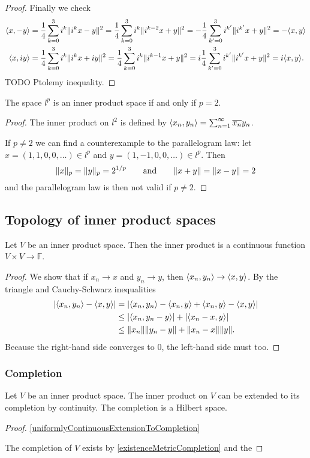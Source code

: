 \begin{proof}
Finally we check
\begin{align*}
\inner{x,-y} &= \frac{1}{4}\sum_{k=0}^3i^k\norm{i^k x - y}^2 = \frac{1}{4}\sum_{k=0}^3i^k\norm{i^{k-2} x + y}^2 = -\frac{1}{4}\sum_{k'=0}^3i^{k'}\norm{i^{k'} x + y}^2 = -\inner{x,y} \\
\inner{x,iy} &= \frac{1}{4}\sum_{k=0}^3i^k\norm{i^k x + iy}^2 = \frac{1}{4}\sum_{k=0}^3i^k\norm{i^{k-1} x + y}^2 = i\frac{1}{4}\sum_{k'=0}^3i^{k'}\norm{i^{k'} x + y}^2 = i\inner{x,y}.
\end{align*}
TODO Ptolemy inequality.
\end{proof}
\begin{corollary}
The space $l^p$ is an inner product space \textup{if and only if} $p=2$.
\end{corollary}
\begin{proof}
The inner product on $l^2$ is defined by $\inner{x_n, y_n} = \sum_{n=1}^\infty \overline{x_n}y_n$.

If $p\neq 2$ we can find a counterexample to the parallelogram law: let $x=(1,1,0,0,\ldots)\in l^p$ and $y = (1,-1,0,0,\ldots)\in l^p$. Then
\[ \lVert x\rVert_p = \lVert y\rVert_p = 2^{1/p} \qquad \text{and} \qquad \lVert x+y\rVert = \lVert x-y\rVert = 2 \]
and the parallelogram law is then not valid if $p\neq 2$.
\end{proof}

\subsection{Topology of inner product spaces}
\begin{lemma}
Let $V$ be an inner product space. Then the inner product is a continuous function $V\times V \to \mathbb{F}$.
\end{lemma}
\begin{proof}
We show that if $x_n \to x$ and $y_n \to y$, then $\inner{x_n,y_n}\to \inner{x,y}$. By the triangle and Cauchy-Schwarz inequalities
\begin{align*}
|\inner{x_n,y_n}-\inner{x,y}| &= |\inner{x_n,y_n}-\inner{x_n,y}+\inner{x_n,y} - \inner{x,y}| \\
&\leq |\inner{x_n, y_n-y}| + |\inner{x_n-x, y}| \\
&\leq \norm{x_n}\norm{y_n-y} + \norm{x_n-x}\norm{y}.
\end{align*}
Because the right-hand side converges to $0$, the left-hand side must too.
\end{proof}

\subsubsection{Completion}
\begin{lemma}
Let $V$ be an inner product space. The inner product on $V$ can be extended to its completion by continuity. The completion is a Hilbert space.
\end{lemma}
\begin{proof}
\ref{uniformlyContinuousExtensionToCompletion}

The completion of $V$ exists by \ref{existenceMetricCompletion} and the 
\end{proof}

